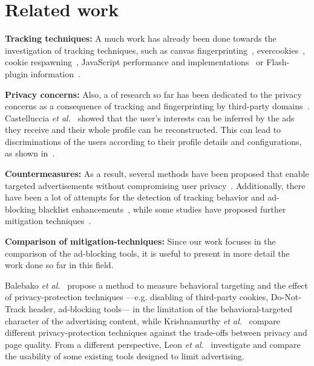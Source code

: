 \chapter{Related work}
\label{sec:related_work}

\textbf{Tracking techniques:} A much work has already been done towards the investigation of tracking techniques, such as canvas fingerprinting~\cite{mowery2012pixel, acar2014web}, evercookies~\cite{acar2014web}, cookie respawning~\cite{acar2014web}, JavaScript performance and implementations~\cite{mulazzani2013fast, mowery2011fingerprinting, nikiforakis2012you} or Flash-plugin information~\cite{eckersley2010unique, soltani, ayensonflash}.

\textbf{Privacy concerns:} Also, a of research so far has been dedicated to the privacy concerns as a consequence of tracking and fingerprinting by third-party domains~\cite{barford, englehardt, krishnamurthy_privacy_diffusion, nikiforakis, soltani, libert2015exposing}. Castelluccia \textit{et al.}~\cite{castelluccia} showed that the user's interests can be inferred by the ads they receive and their whole profile can be reconstructed. This can lead to discriminations of the users according to their profile details and configurations, as shown in~\cite{mikians, datta}.

\textbf{Countermeasures:} As a result, several methods have been proposed that enable targeted advertisements without compromising user privacy~\cite{adnostic, privad, nurikabe, haddadi, juels, androulaki}. Additionally, there have been a lot of attempts for the detection of tracking behavior and ad-blocking blacklist enhancements~\cite{ma, gugelmann, tran}, while some studies have proposed further mitigation techniques~\cite{roesner, kontaxis}.

\textbf{Comparison of mitigation-techniques:} Since our work focuses in the comparison of the ad-blocking tools, it is useful to present in more detail the work done so far in this field.

Balebako \textit{et al.}~\cite{balebako} propose a method to measure behavioral targeting and the effect of privacy-protection techniques ---e.g. disabling of third-party cookies, Do-Not-Track header, ad-blocking tools--- in the limitation of the behavioral-targeted character of the advertising content, while Krishnamurthy \textit{et al.}~\cite{krishnamurthy_measuring_privacy_loss} compare different privacy-protection techniques against the trade-offs between privacy and page quality. From a different perspective, Leon \textit{et al.}~\cite{leon} investigate and compare the usability of some existing tools designed to limit advertising.

